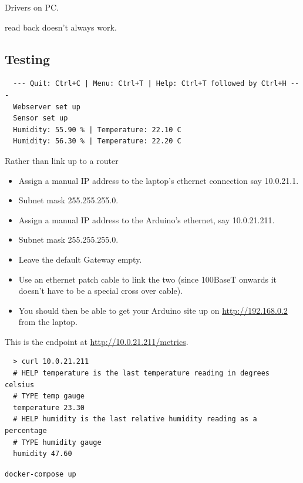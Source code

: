 \documentclass[a4paper, 12pt]{article}
\begin{document}
Drivers on PC.

read back doesn't always work.

\subsection{Testing}

\begin{verbatim}
  --- Quit: Ctrl+C | Menu: Ctrl+T | Help: Ctrl+T followed by Ctrl+H ---
  Webserver set up
  Sensor set up
  Humidity: 55.90 % | Temperature: 22.10 C
  Humidity: 56.30 % | Temperature: 22.20 C
\end{verbatim}


Rather than link up to a router

\begin{itemize}
  \item Assign a manual IP address to the laptop's ethernet connection say 10.0.21.1.
  \item Subnet mask 255.255.255.0.
  \item Assign a manual IP address to the Arduino's ethernet, say 10.0.21.211.
  \item Subnet mask 255.255.255.0.
  \item Leave the default Gateway empty.
  \item Use an ethernet patch cable to link the two (since 100BaseT onwards it doesn't have to be a special cross over cable).
  \item You should then be able to get your Arduino site up on \url{http://192.168.0.2} from the laptop.
\end{itemize}
  
This is the endpoint at \url{http://10.0.21.211/metrics}.
  
\begin{verbatim}
  > curl 10.0.21.211
  # HELP temperature is the last temperature reading in degrees celsius
  # TYPE temp gauge
  temperature 23.30
  # HELP humidity is the last relative humidity reading as a percentage
  # TYPE humidity gauge
  humidity 47.60
\end{verbatim}

\verb|docker-compose up|
\end{document}

